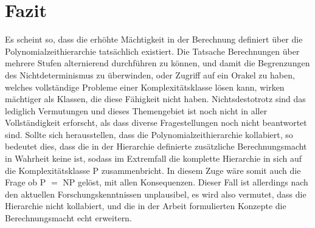 \chapter{Fazit} \label{chapter: Fazit}
Es scheint so, dass die erhöhte Mächtigkeit in der Berechnung definiert über die Polynomialzeithierarchie tatsächlich existiert.
Die Tatsache Berechnungen über mehrere Stufen alternierend durchführen zu können, und damit die Begrenzungen des Nichtdeterminismus zu überwinden,
oder Zugriff auf ein Orakel zu haben, welches vollständige Probleme einer Komplexitätsklasse lösen kann, wirken mächtiger als Klassen, die diese Fähigkeit nicht haben.
Nichtsdestotrotz sind das lediglich Vermutungen und dieses Themengebiet ist noch nicht in aller Vollständigkeit erforscht, als dass diverse Fragestellungen noch nicht beantwortet sind.
Sollte sich herausstellen, dass die Polynomialzeithierarchie kollabiert, so bedeutet dies, dass die in der Hierarchie definierte zusätzliche Berechnungsmacht 
in Wahrheit keine ist, sodass im Extremfall die komplette Hierarchie in sich auf die Komplexitätsklasse P zusammenbricht. In diesem Zuge wäre somit auch die Frage ob  P $=$ NP gelöst,
mit allen Konsequenzen. Dieser Fall ist allerdings nach den aktuellen Forschungskenntnissen unplausibel, es wird also vermutet, dass die Hierarchie nicht kollabiert, und die in der Arbeit formulierten Konzepte
die Berechnungsmacht echt erweitern.  